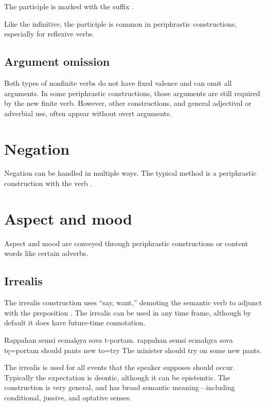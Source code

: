 The participle is marked with the suffix .

Like the infinitive, the participle is common in periphrastic constructions, especially for reflexive verbs.

\subsection{Argument omission} \label{sub:nonfinite_argument_omission}
Both types of nonfinite verbs do not have fixed valence and can omit all arguments. In some periphrastic constructions, those arguments are still required by the new finite verb. However, other constructions, and general adjectival or adverbial use, often appear without overt arguments.

\section{Negation}
Negation can be handled in multiple ways. The typical method is a periphrastic construction with the verb .

\section{Aspect and mood}
Aspect and mood are conveyed through periphrastic constructions or content words like certain adverbs.

\subsection{Irrealis}
The irrealis construction uses  “say, want,” demoting the semantic verb to adjunct with the preposition . The irrealis can be used in any time frame, although by default it does have future-time connotation.

\begin{example}
	\script Rappahan semsi ecmalǫya sova t-portam.
	\bits rappahan semsi ecmalǫya sova tę=portam
	 should pants new to=try
	\tr The minister should try on some new pants. 
\end{example}

The irrealis is used for all events that the speaker supposes should occur. Typically the expectation is deontic, although it can be epistemtic. The construction is very general, and has broad semantic meaning---including conditional, jussive, and optative senses.